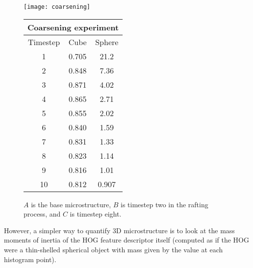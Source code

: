 \documentclass[review]{elsarticle}
\begin{document}
	\begin{figure}[!ht]
    	\begin{center}
			\texttt{[image: coarsening]}
	  		\caption{ $A$ is the base microstructure, $B$ is timestep two in the rafting process, and $C$ is timestep eight. }
	  		\label{figure8}
  		
			\begin{tabular}{ c | c | c }
				\multicolumn{3}{c}{Coarsening experiment} \\
				\hline
				Timestep & Cube & Sphere \\
				\hline
				1 & 0.705 & 21.2 \\
				2 & 0.848 & 7.36 \\
				3 & 0.871 & 4.02 \\
				4 & 0.865 & 2.71 \\
				5 & 0.855 & 2.02 \\
				6 & 0.840 & 1.59 \\
				7 & 0.831 & 1.33 \\
				8 & 0.823 & 1.14 \\
				9 & 0.816 & 1.01 \\
				10 & 0.812 & 0.907 \\
				\hline
			\end{tabular}
			\label{table3}
		\end{center}
	\end{figure}
	
	However, a simpler way to quantify 3D microstructure is to look at the mass moments of inertia of the HOG feature descriptor itself (computed as if the HOG were a thin-shelled spherical object with mass given by the value at each histogram point).%
	
\end{document}
